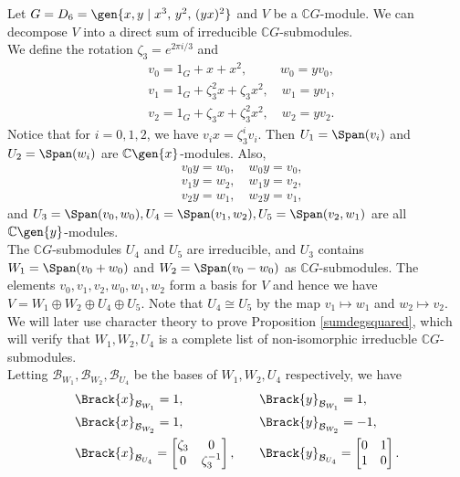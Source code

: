 \documentclass[../Project.tex]{subfiles}
\begin{document}
\begin{exam}
	\label{D6decomp}
	Let $G = D_6 = \gen{x,y\;\vert\;x^3,\, y^2,\,(yx)^2}$ and $V$ be a $\mathbb{C}G$-module. We can decompose $V$ into a direct sum of irreducible $\mathbb{C}G$-submodules.\\

	We define the rotation $\zeta_3 = e^{2\pi i / 3}$ and
	\begin{align*}
		&v_0 = 1_G + x + x^2, \quad\quad\;\; w_0 = yv_0,\\
		&v_1 = 1_G + \zeta_3^2x + \zeta_3 x^2, \quad w_1 = yv_1,\\
		&v_2 = 1_G + \zeta_3 x + \zeta_3^2 x^2, \quad w_2 = yv_2.
	\end{align*}
	Notice that for $i = 0,1,2$, we have $v_ix = \zeta_3^iv_i$. Then $U_1 = \Span(v_i)$ and $U_2 = \Span(w_i)$ are $\mathbb{C}\gen{x}$-modules. Also,
	\begin{align*}
		&v_0y = w_0,\quad w_0y  = v_0,\\
		&v_1y = w_2,\quad w_1y = v_2,\\
		&v_2y = w_1,\quad w_2y = v_1,
	\end{align*}
	and $U_3 = \Span({v_0,w_0}),U_4 = \Span({v_1,w_2}), U_5 =\Span({v_2,w_1})$ are all $\mathbb{C}\gen{y}$-modules.\\

	The $\mathbb{C}G$-submodules $U_4$ and $U_5$ are irreducible, and $U_3$ contains $W_1 = \Span(v_0 + w_0)$ and $W_2 = \Span(v_0 - w_0)$ as $\mathbb{C}G$-submodules. The elements $v_0,v_1,v_2,w_0,w_1,w_2$ form a basis for $V$ and hence we have $V = W_1 \oplus W_2 \oplus U_4 \oplus U_5$. Note that $U_4 \cong U_5$ by the map $v_1 \mapsto w_1$ and $w_2 \mapsto v_2$.\\

	We will later use character theory to prove Proposition \ref{sumdegsquared}, which will verify that $W_1,W_2,U_4$ is a complete list of non-isomorphic irreducble $\mathbb{C}G$-submodules.\\

	Letting $\mathcal{B}_{W_1},\mathcal{B}_{W_2},\mathcal{B}_{U_4}$ be the bases of $W_1,W_2,U_4$ respectively, we have
	\begin{alignat*}{3}
		&\Brack{x}_{\mathcal{B}_{W_1}} = 1,&&\Brack{y}_{\mathcal{B}_{W_1}} = 1,\\
		&\Brack{x}_{\mathcal{B}_{W_2}} = 1,&&\Brack{y}_{\mathcal{B}_{W_2}} = -1,\\
		&\Brack{x}_{\mathcal{B}_{U_4}} = \begin{bmatrix}\zeta_3 & 0\\0 & \zeta_3^{-1}\end{bmatrix},\quad &&\Brack{y}_{\mathcal{B}_{U_4}} = \begin{bmatrix}0 & 1\\1 & 0 \end{bmatrix}.
	\end{alignat*}
\end{exam}
\end{document}
